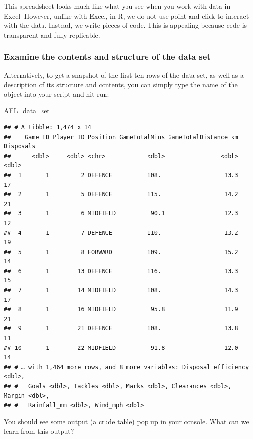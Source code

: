 \documentclass[
]{article}
\newenvironment{Shaded}{\begin{snugshade}}{\end{snugshade}}
\newcommand{\NormalTok}[1]{#1}
\begin{document}
This spreadsheet looks much like what you see when you work with data in
Excel. However, unlike with Excel, in R, we do not use point-and-click
to interact with the data. Instead, we write pieces of code. This is
appealing because code is transparent and fully replicable.

\hypertarget{examine-the-contents-and-structure-of-the-data-set}{%
\subsubsection{Examine the contents and structure of the data
set}\label{examine-the-contents-and-structure-of-the-data-set}}

Alternatively, to get a snapshot of the first ten rows of the data set,
as well as a description of its structure and contents, you can simply
type the name of the object into your script and hit run:

\begin{Shaded}
\begin{Highlighting}[]
\NormalTok{AFL\_data\_set}
\end{Highlighting}
\end{Shaded}

\begin{verbatim}
## # A tibble: 1,474 x 14
##    Game_ID Player_ID Position GameTotalMins GameTotalDistance_km Disposals
##      <dbl>     <dbl> <chr>            <dbl>                <dbl>     <dbl>
##  1       1         2 DEFENCE          108.                  13.3        17
##  2       1         5 DEFENCE          115.                  14.2        21
##  3       1         6 MIDFIELD          90.1                 12.3        12
##  4       1         7 DEFENCE          110.                  13.2        19
##  5       1         8 FORWARD          109.                  15.2        14
##  6       1        13 DEFENCE          116.                  13.3        15
##  7       1        14 MIDFIELD         108.                  14.3        17
##  8       1        16 MIDFIELD          95.8                 11.9        21
##  9       1        21 DEFENCE          108.                  13.8        11
## 10       1        22 MIDFIELD          91.8                 12.0        14
## # … with 1,464 more rows, and 8 more variables: Disposal_efficiency <dbl>,
## #   Goals <dbl>, Tackles <dbl>, Marks <dbl>, Clearances <dbl>, Margin <dbl>,
## #   Rainfall_mm <dbl>, Wind_mph <dbl>
\end{verbatim}

You should see some output (a crude table) pop up in your console. What
can we learn from this output?
\end{document}
